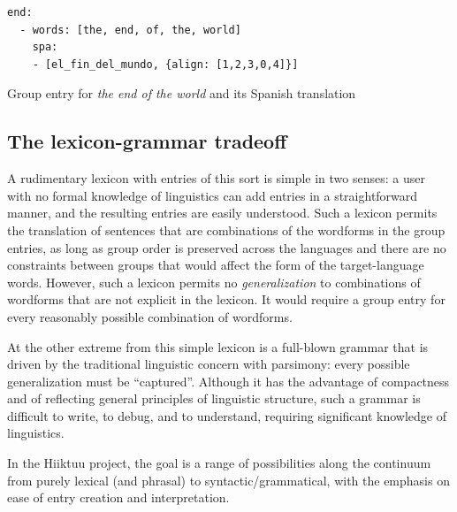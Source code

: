 \documentclass[11pt, a4paper]{article}
\begin{document}
\begin{entry}
\small
\begin{verbatim}
end:
  - words: [the, end, of, the, world]
    spa:
    - [el_fin_del_mundo, {align: [1,2,3,0,4]}]
\end{verbatim}
\normalsize
\caption{Group entry for \textit{the end of the world} and its Spanish translation}
\label{entry:end}
\end{entry}

\subsection{The lexicon-grammar tradeoff}
\label{subsect:lexgram}

A rudimentary lexicon with entries of this sort is simple
in two senses: a user with no formal knowledge of linguistics can add entries in a
straightforward manner, and the resulting entries are
easily understood.
Such a lexicon permits the translation of sentences that are combinations
of the wordforms in the group entries, as long as group order is preserved across
the languages and there are no constraints between groups that would affect the form
of the target-language words.
However, such a lexicon permits no
{\em generalization} to combinations of wordforms that are not explicit in the lexicon.
It would require a group entry for every reasonably possible combination of
wordforms.

At the other extreme from this simple lexicon is a full-blown grammar that is driven by
the traditional linguistic concern
with parsimony:
every possible generalization must be ``captured''.
Although it has the advantage of compactness and of reflecting general principles
of linguistic structure, such a grammar is difficult
to write, to debug, and to understand, requiring significant knowledge of linguistics.

In the Hiiktuu project, the goal is a range of possibilities along the continuum from
purely lexical (and phrasal) to syntactic/grammatical, with the emphasis on ease of entry
creation and interpretation.
\end{document}
